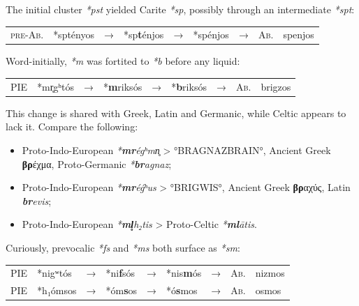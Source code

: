 \documentclass[svgnames,x11names,b5paper]{book}
\begin{document}
        The initial cluster \textit{*pst} yielded Carite \textit{*sp}, possibly through an intermediate \textit{*spt}:

            \begin{table}[H]
                \begin{center}
                \begin{tabular}{llcllllll}
                \textsc{pre-Ab.} & *sptényos & → & *sp\textbf{t}énjos & → & *spénjos & → & \textsc{Ab.} & spenjos\\
                \end{tabular}
                \end{center}
                \end{table}
        
        Word-initially, \textit{*m} was fortited to \textit{*b} before any liquid:

            \begin{table}[H]
                \begin{center}
                \begin{tabular}{llcllllll}
                \textsc{PIE} & *mr̥gʰtós & → & *\textbf{m}riksós & → & *\textbf{b}riksós & → & \textsc{Ab.} & brigzos\\
                \end{tabular}
                \end{center}
                \end{table}
        
            This change is shared with Greek, Latin and Germanic, while Celtic appears to lack it. Compare the following:
\begin{itemize}
\item  Proto-Indo-European \textit{*\textbf{mr}égʰmn̥} > °BRAGNAZBRAIN°, Ancient Greek \textbf{βρ}έχμα, Proto-Germanic \textit{*\textbf{br}agnaz};\\
\item  Proto-Indo-European \textit{*\textbf{mr}éǵʰus} > °BRIGWIS°, Ancient Greek \textbf{βρ}αχύς, Latin \textit{\textbf{br}evis};\\
\item  Proto-Indo-European \textit{*\textbf{ml̥}h₂tis} > Proto-Celtic \textit{*\textbf{ml}ātis}.\\
\end{itemize}

        Curiously, prevocalic \textit{*fs} and \textit{*ms} both surface as \textit{*sm}:

            \begin{table}[H]
                \begin{center}
                \begin{tabular}{llcllllll}
                \textsc{PIE} & *nigʷtós & → & *ni\textbf{f}sós & → & *nis\textbf{m}ós & → & \textsc{Ab.} & nizmos\\
                \textsc{PIE} & *h₁ómsos & → & *óm\textbf{s}os & → & *ó\textbf{s}mos & → & \textsc{Ab.} & osmos\\
                \end{tabular}
                \end{center}
                \end{table}
        
\end{document}
